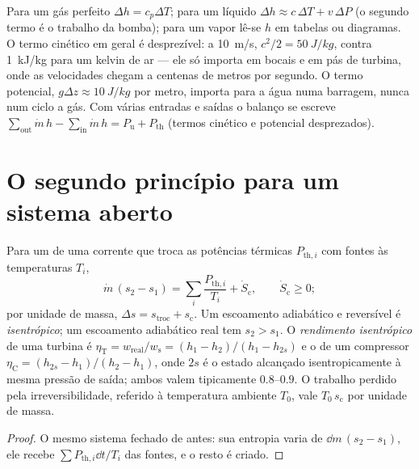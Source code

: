 \begin{remark}\label{rem:b2:open-systems:using}
Para um gás perfeito $\Delta h = c_p\Delta T$; para um líquido $\Delta h \approx
c\,\Delta T + v\,\Delta P$ (o segundo termo é o trabalho da bomba); para um vapor
lê-se $h$ em tabelas ou diagramas. O termo cinético em geral é
desprezível: a \qty{10}{m/s}, $c^2/2 = \qty{50}{J/kg}$, contra
\qty{1}{kJ/kg} para um kelvin de ar --- ele só importa em bocais e
em pás de turbina, onde as velocidades chegam a centenas de metros por segundo. O
termo potencial, $g\Delta z \approx \qty{10}{J/kg}$ por metro, importa para a
água numa barragem, nunca num ciclo a gás. Com várias entradas e saídas
o balanço se escreve $\sum_{\text{out}}\dot m\,h - \sum_{\text{in}}\dot m\,h =
P_{\text{u}} + P_{\text{th}}$ (termos cinético e potencial desprezados).
\end{remark}

\section{O segundo princípio para um sistema aberto}

\begin{theorem}\label{thm:b2:open-systems:secondlaw}
Para um  de uma corrente que troca as potências térmicas
$P_{\text{th},i}$ com fontes às temperaturas $T_i$,
\[
\dot m\,(s_2 - s_1) = \sum_i\frac{P_{\text{th},i}}{T_i} + \dot S_{\text{c}},
\qquad \dot S_{\text{c}} \ge 0 ;
\]
por unidade de massa, $\Delta s = s_{\text{troc}} + s_{\text{c}}$. Um escoamento
adiabático e reversível é \emph{isentrópico}; um escoamento adiabático real tem $s_2 >
s_1$. O \emph{rendimento isentrópico} de
uma turbina é $\eta_{\text{T}} = w_{\text{real}}/w_{\text{s}} = (h_1 - h_2)/(h_1
- h_{2s})$ e o de um compressor $\eta_{\text{C}} = (h_{2s} - h_1)/(h_2 -
h_1)$, onde $2s$ é o estado alcançado isentropicamente à mesma
pressão de saída; ambos valem tipicamente $0.8$--$0.9$. O trabalho perdido pela
irreversibilidade, referido à temperatura ambiente $T_0$, vale
$T_0\,s_{\text{c}}$ por unidade de massa.
\end{theorem}

\begin{proof}
O mesmo sistema fechado de antes: sua entropia varia de $\dd m\,(s_2 -
s_1)$, ele recebe $\sum P_{\text{th},i}\dd t/T_i$ das fontes, e o
resto é criado.
\end{proof}

